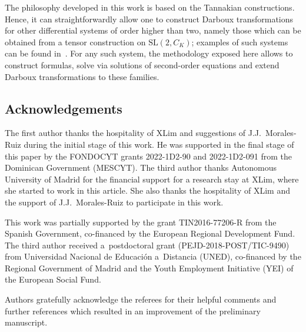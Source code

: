 \documentclass[10pt,a4paper]{amsart}
\numberwithin{equation}{section}
\begin{document}
The philosophy developed in this work is based on the Tannakian constructions. Hence, it can straightforwardly allow one to construct Darboux transformations for other differential systems of order higher than two, namely those which can be obtained from a tensor construction on $\mathrm{SL}(2, C_K)$; examples of such systems can be found in~\cite{CoPl94d}.
For any such system, the methodology exposed here allows to construct formulas, solve via solutions of second-order equations and extend Darboux transformations to these families.

\subsection*{Acknowledgements}

The first author thanks the hospitality of XLim and suggestions of J.J.~Morales-Ruiz during the initial stage of this work.
He was supported in the final stage of this paper by the FONDOCYT grants 2022-1D2-90 and 2022-1D2-091 from the Dominican Government (MESCYT).
The third author thanks Autonomous University of Madrid for the financial support for a research stay at XLim, where she started to work in this article. She also thanks the hospitality of XLim and the support of J.J.~Morales-Ruiz to participate in this work.

This work was partially supported by the grant TIN2016-77206-R from the Spanish Government, co-financed by the European Regional Development Fund. The third author received a~postdoctoral grant (PEJD-2018-POST/TIC-9490) from Universidad Nacional de Educaci\'on a~Distancia (UNED), co-financed by the Regional Government of Madrid and the Youth Employment Initiative (YEI) of the European Social Fund.

Authors gratefully acknowledge the referees for
their helpful comments and further references which resulted in an improvement of the preliminary manuscript.

\end{document}
